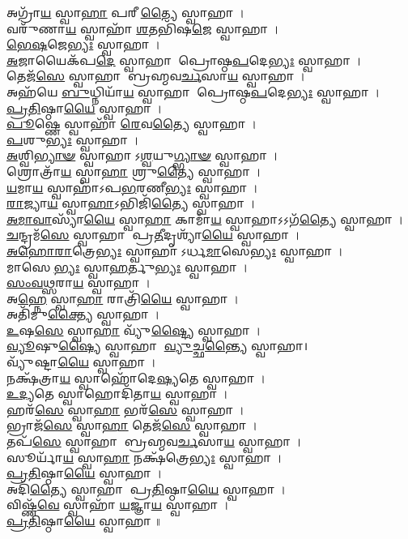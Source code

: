 𑌅𑌗𑍍𑌰𑌾᳴\-\ul{𑌯} 𑌸𑍍𑌵𑌾\-\ul{𑌹𑌾} 𑌪𑌰𑍀\-\ul{𑌤𑍍𑌯𑍈} 𑌸𑍍𑌵𑌾𑌹𑌾।\\
𑌵𑌰𑍁᳴𑌣𑌾\-\ul{𑌯} 𑌸𑍍𑌵𑌾𑌹𑌾᳴ \ul{𑌶}\-𑌤𑌭𑌿᳴𑌷\-\ul{𑌜𑍇} 𑌸𑍍𑌵𑌾𑌹𑌾।\\
\-\ul{𑌭𑍇}\-\-\ul{𑌷}\-𑌜𑍇\-\ul{𑌭𑍍𑌯𑌃} 𑌸𑍍𑌵𑌾𑌹𑌾।\\
\-\ul{𑌅}\-𑌜𑌾𑌯𑍈𑌕᳴𑌪\-\ul{𑌦𑍇} 𑌸𑍍𑌵𑌾𑌹𑌾 𑌪𑍍𑌰𑍋𑌷𑍍𑌠\-\ul{𑌪}\-𑌦𑍇\-\ul{𑌭𑍍𑌯𑌃} 𑌸𑍍𑌵𑌾𑌹𑌾।\\
𑌤𑍇𑌜᳴\-\ul{𑌸𑍇} 𑌸𑍍𑌵𑌾𑌹𑌾 𑌬𑍍𑌰𑌹𑍍𑌮𑌵\-\ul{𑌰𑍍𑌚}\-𑌸𑌾\-\ul{𑌯} 𑌸𑍍𑌵𑌾𑌹𑌾।\\
𑌅𑌹᳴𑌯𑍇 \ul{𑌬𑍁}\-𑌧𑍍𑌨𑌿𑌯𑌾᳴\-\ul{𑌯} 𑌸𑍍𑌵𑌾𑌹𑌾 𑌪𑍍𑌰𑍋𑌷𑍍𑌠\-\ul{𑌪}\-𑌦𑍇\-\ul{𑌭𑍍𑌯𑌃} 𑌸𑍍𑌵𑌾𑌹𑌾।\\
\-\ul{𑌪𑍍𑌰}\-\-\ul{𑌤𑌿}\-𑌷𑍍𑌠𑌾\-\ul{𑌯𑍈} 𑌸𑍍𑌵𑌾𑌹𑌾।\\
\-\ul{𑌪𑍂}\-𑌷𑍍𑌣𑍇 𑌸𑍍𑌵𑌾𑌹𑌾᳴ \ul{𑌰𑍇}\-𑌵\-\ul{𑌤𑍍𑌯𑍈} 𑌸𑍍𑌵𑌾𑌹𑌾।\\
\-\ul{𑌪}\-𑌶𑍁\-\ul{𑌭𑍍𑌯𑌃} 𑌸𑍍𑌵𑌾𑌹𑌾।\\
\-\ul{𑌅}\-𑌶𑍍𑌵𑌿\-\ul{𑌭𑍍𑌯𑌾}\-\-\ul{𑍟} 𑌸𑍍𑌵𑌾𑌹𑌾𑌽\-\ul{𑌶𑍍𑌵}\-𑌯𑍁\-\ul{𑌗𑍍𑌭𑍍𑌯𑌾}\-\-\ul{𑍟} 𑌸𑍍𑌵𑌾𑌹𑌾।\\
𑌶𑍍𑌰𑍋𑌤𑍍𑌰𑌾᳴\-\ul{𑌯} 𑌸𑍍𑌵𑌾\-\ul{𑌹𑌾} 𑌶𑍍𑌰𑍁\-\ul{𑌤𑍍𑌯𑍈} 𑌸𑍍𑌵𑌾𑌹𑌾।\\
\-\ul{𑌯}\-𑌮𑌾\-\ul{𑌯} 𑌸𑍍𑌵𑌾𑌹𑌾᳴𑌽𑌪\-\ul{𑌭}\-𑌰𑌣𑍀\-\ul{𑌭𑍍𑌯𑌃} 𑌸𑍍𑌵𑌾𑌹𑌾।\\
\-\ul{𑌰𑌾}\-𑌜𑍍𑌯𑌾\-\ul{𑌯} 𑌸𑍍𑌵𑌾\-\ul{𑌹𑌾}\-𑌽𑌭𑌿𑌜𑌿᳴\-\ul{𑌤𑍍𑌯𑍈} 𑌸𑍍𑌵𑌾𑌹𑌾।\\
\-\ul{𑌅}\-\-\ul{𑌮𑌾}\-\-\ul{𑌵𑌾}\-𑌸𑍍𑌯𑌾᳴\-\ul{𑌯𑍈} 𑌸𑍍𑌵𑌾\-\ul{𑌹𑌾} 𑌕𑌾𑌮𑌾᳴\-\ul{𑌯} 𑌸𑍍𑌵𑌾𑌹𑌾𑌽𑌽𑌗᳴\-\ul{𑌤𑍍𑌯𑍈} 𑌸𑍍𑌵𑌾𑌹𑌾।\\
\-\ul{𑌚}\-𑌨𑍍𑌦𑍍𑌰𑌮᳴\-\ul{𑌸𑍇} 𑌸𑍍𑌵𑌾𑌹𑌾 𑌪𑍍𑌰\-\ul{𑌤𑍀}\-𑌦𑍃𑌶𑍍𑌯𑌾᳴\-\ul{𑌯𑍈} 𑌸𑍍𑌵𑌾𑌹𑌾।\\
\-\ul{𑌅}\-\-\ul{𑌹𑍋}\-\-\ul{𑌰𑌾}\-𑌤𑍍𑌰𑍇\-\ul{𑌭𑍍𑌯𑌃} 𑌸𑍍𑌵𑌾𑌹𑌾𑌽𑌰𑍍𑌧\-\ul{𑌮𑌾}\-𑌸𑍇\-\ul{𑌭𑍍𑌯𑌃} 𑌸𑍍𑌵𑌾𑌹𑌾।\\
𑌮𑌾𑌸𑍇\-\ul{𑌭𑍍𑌯𑌃} 𑌸𑍍𑌵𑌾\-\ul{𑌹}\-𑌰𑍍𑌤𑍁\-\ul{𑌭𑍍𑌯𑌃} 𑌸𑍍𑌵𑌾𑌹𑌾।\\
\-\ul{𑌸𑌂}\-\-\ul{𑌵}\-\-\ul{𑌥𑍍𑌸}\-𑌰𑌾\-\ul{𑌯} 𑌸𑍍𑌵𑌾𑌹𑌾।\\
𑌅\-\ul{𑌹𑍍𑌨𑍇} 𑌸𑍍𑌵𑌾\-\ul{𑌹𑌾} 𑌰𑌾𑌤𑍍𑌰𑌿᳴\-\ul{𑌯𑍈} 𑌸𑍍𑌵𑌾𑌹𑌾।\\
𑌅𑌤𑌿᳴𑌮𑍁\-\ul{𑌕𑍍𑌤𑍍𑌯𑍈} 𑌸𑍍𑌵𑌾𑌹𑌾।\\
\-\ul{𑌉}\-𑌷\-\ul{𑌸𑍇} 𑌸𑍍𑌵𑌾\-\ul{𑌹𑌾} 𑌵𑍍𑌯𑍁᳴\-\ul{𑌷𑍍𑌟𑍍𑌯𑍈} 𑌸𑍍𑌵𑌾𑌹𑌾।\\
\-\ul{𑌵𑍍𑌯𑍂}\-𑌷𑍁\-\ul{𑌷𑍍𑌯𑍈} 𑌸𑍍𑌵𑌾𑌹𑌾 \ul{𑌵𑍍𑌯𑍁}\-𑌚𑍍𑌛\-\ul{𑌨𑍍𑌤𑍍𑌯𑍈} 𑌸𑍍𑌵𑌾𑌹𑌾।\\
𑌵𑍍𑌯𑍁᳴𑌷𑍍𑌟𑌾\-\ul{𑌯𑍈} 𑌸𑍍𑌵𑌾𑌹𑌾।\\
𑌨𑌕𑍍𑌷᳴𑌤𑍍𑌰𑌾\-\ul{𑌯} 𑌸𑍍𑌵𑌾𑌹𑍋᳴𑌦𑍇\-\ul{𑌷𑍍𑌯}\-𑌤𑍇 𑌸𑍍𑌵𑌾𑌹𑌾।\\
\-\ul{𑌉}\-\-\ul{𑌦𑍍𑌯}\-𑌤𑍇 𑌸𑍍𑌵𑌾𑌹𑍋𑌦𑌿᳴𑌤𑌾\-\ul{𑌯} 𑌸𑍍𑌵𑌾𑌹𑌾।\\
𑌹𑌰᳴\-\ul{𑌸𑍇} 𑌸𑍍𑌵𑌾\-\ul{𑌹𑌾} 𑌭𑌰᳴\-\ul{𑌸𑍇} 𑌸𑍍𑌵𑌾𑌹𑌾।\\
𑌭𑍍𑌰𑌾𑌜᳴\-\ul{𑌸𑍇} 𑌸𑍍𑌵𑌾\-\ul{𑌹𑌾} 𑌤𑍇𑌜᳴\-\ul{𑌸𑍇} 𑌸𑍍𑌵𑌾𑌹𑌾।\\
𑌤𑌪᳴\-\ul{𑌸𑍇} 𑌸𑍍𑌵𑌾𑌹𑌾 𑌬𑍍𑌰𑌹𑍍𑌮𑌵\-\ul{𑌰𑍍𑌚}\-𑌸𑌾\-\ul{𑌯} 𑌸𑍍𑌵𑌾𑌹𑌾।\\
𑌸𑍂𑌰𑍍𑌯𑌾᳴\-\ul{𑌯} 𑌸𑍍𑌵𑌾\-\ul{𑌹𑌾} 𑌨𑌕𑍍𑌷᳴𑌤𑍍𑌰𑍇\-\ul{𑌭𑍍𑌯𑌃} 𑌸𑍍𑌵𑌾𑌹𑌾।\\
\-\ul{𑌪𑍍𑌰}\-\-\ul{𑌤𑌿}\-𑌷𑍍𑌠𑌾\-\ul{𑌯𑍈} 𑌸𑍍𑌵𑌾𑌹𑌾।\\
𑌅𑌦𑌿᳴\-\ul{𑌤𑍍𑌯𑍈} 𑌸𑍍𑌵𑌾𑌹𑌾 𑌪𑍍𑌰\-\ul{𑌤𑌿}\-𑌷𑍍𑌠𑌾\-\ul{𑌯𑍈} 𑌸𑍍𑌵𑌾𑌹𑌾।\\
𑌵𑌿𑌷𑍍𑌣᳴\-\ul{𑌵𑍇} 𑌸𑍍𑌵𑌾𑌹𑌾᳴ \ul{𑌯}\-𑌜𑍍𑌞𑌾\-\ul{𑌯} 𑌸𑍍𑌵𑌾𑌹𑌾।\\
\-\ul{𑌪𑍍𑌰}\-\-\ul{𑌤𑌿}\-𑌷𑍍𑌠𑌾\-\ul{𑌯𑍈} 𑌸𑍍𑌵𑌾𑌹𑌾॥\\

